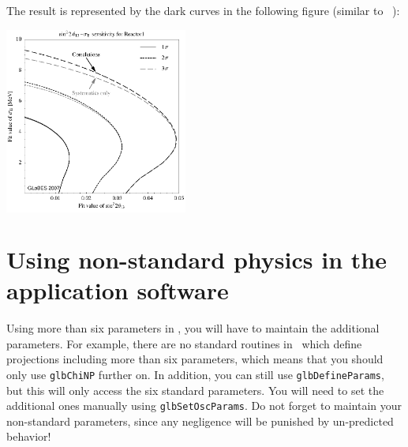 {The result is represented by the dark curves
 in the following figure (similar to \Ref~\cite{Blennow:2005yk}):
\begin{center}
\colorbox{white}{\includegraphics[width=6cm]{reactorNSI}}
\end{center}
}

\section{Using non-standard physics in the application software}

Using more than six parameters in \GLOBES , you will have to maintain the additional parameters. 
For example, there are no standard routines in \GLOBES\ which define projections including more than six parameters, 
which means that you should only use {\tt glbChiNP} further on. In addition, you can still use {\tt glbDefineParams}, but this 
will only access the six standard parameters. You will need to set the additional ones manually using {\tt glbSetOscParams}. 
Do not forget to maintain your non-standard parameters, since any negligence will be punished by un-predicted behavior!

